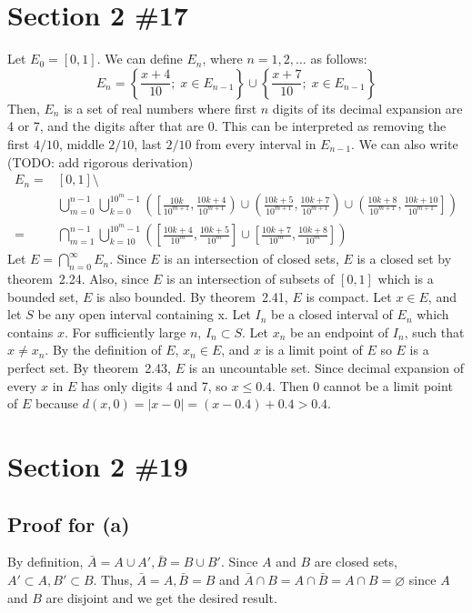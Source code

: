 \documentclass{scrartcl}
\begin{document}
\section{Section 2 \#17}
Let \(E_0 = [0, 1]\).
We can define \(E_n\), where \(n = 1, 2, \dots\) as follows:
\[
  E_n = \left\{ \frac{x + 4}{10};\; x \in E_{n - 1} \right\} \cup \left\{ \frac{x + 7}{10};\; x \in E_{n - 1} \right\}
\]
Then, \(E_n\) is a set of real numbers where first \(n\) digits of its decimal expansion are 4 or 7, and the digits after that are 0.
This can be interpreted as removing the first \(4 / 10\), middle \(2 / 10\), last \(2 / 10\) from every interval in \(E_{n - 1}\).
We can also write (TODO: add rigorous derivation)
\begin{align*}
  E_n =& [0, 1] \setminus \\
       &\bigcup^{n - 1}_{m = 0} \bigcup^{10^m - 1}_{k = 0} \left( \left[ \frac{10k}{10^{m + 1}}, \frac{10k + 4}{10^{m + 1}} \right) \cup \left( \frac{10k + 5}{10^{m + 1}}, \frac{10k + 7}{10^{m + 1}} \right) \cup \left( \frac{10k + 8}{10^{m + 1}}, \frac{10k + 10}{10^{m + 1}} \right] \right) \\
      =& \bigcap^{n - 1}_{m = 1} \bigcup^{10^m - 1}_{k = 10} \left( \left[ \frac{10k + 4}{10^m}, \frac{10k + 5}{10^m} \right] \cup \left[ \frac{10k + 7}{10^m}, \frac{10k + 8}{10^m} \right] \right)
\end{align*}
Let \(E = \bigcap^\infty_{n = 0} E_n\).
Since \(E\) is an intersection of closed sets, \(E\) is a closed set by theorem~2.24.
Also, since \(E\) is an intersection of subsets of \([0, 1]\) which is a bounded set, \(E\) is also bounded.
By theorem~2.41, \(E\) is compact.
Let \(x \in E\), and let \(S\) be any open interval containing x. Let \(I_n\) be a closed interval of \(E_n\) which contains \(x\).
For sufficiently large \(n\), \(I_n \subset S\).
Let \(x_n\) be an endpoint of \(I_n\), such that \(x \not = x_n\).
By the definition of \(E\), \(x_n \in E\), and \(x\) is a limit point of \(E\) so \(E\) is a perfect set.
By theorem~2.43, \(E\) is an uncountable set.
Since decimal expansion of every \(x\) in \(E\) has only digits 4 and 7, so \(x \leq 0.4\).
Then 0 cannot be a limit point of \(E\) because \(d(x, 0) = |x - 0| = (x - 0.4) + 0.4 > 0.4\).

\section{Section 2 \#19}
\subsection{Proof for (a)}
By definition, \(\bar{A} = A \cup A', \bar{B} = B \cup B'\).
Since \(A\) and \(B\) are closed sets, \(A' \subset A, B' \subset B\).
Thus, \(\bar{A} = A, \bar{B} = B\) and \(\bar{A} \cap B = A \cap \bar{B} = A \cap B = \varnothing\) since \(A\) and \(B\) are disjoint and we get the desired result.
\end{document}
